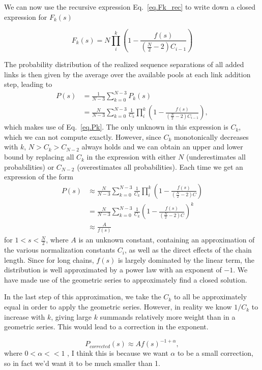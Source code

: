 \documentclass[reprint,amsmath,amssymb,rmp,onecolumn,notitlepage,11pt]{revtex4-1}
\newcommand{\red}[1]{\textcolor{red!80!black}{#1}}
\begin{document}
We can now use the recursive expression Eq.~\ref{eq.Fk_rec} to write down a closed expression for $F_k(s)$

\begin{equation}
    F_k(s)=N\prod_{i}^k\left(1-\frac{f(s)}{(\frac{N}{2}-2)C_{i-1}} \right)
\end{equation}

The probability distribution of the realized sequence separations of all added links is then given by the average over the available pools at each link addition step, leading to
\begin{align}
    P(s)&=\frac{1}{N-3}\sum_{k=0}^{N-3} P_k(s) \nonumber \\
    &= \frac{N}{N-3}\sum_{k=0}^{N-3} \frac{1}{C_k}\prod_{i}^k\left(1-\frac{f(s)}{(\frac{N}{2}-2)C_{i-1}} \right),
\end{align}
which makes use of Eq.~\ref{eq.Pk}. The only unknown in this expression is $C_k$, which we can not compute exactly. However, since $C_k$ monotonically decreases with $k$, $N>C_k>C_{N-2}$ always holds and we can obtain an upper and lower bound by replacing all $C_k$ in the expression with either $N$ (underestimates all probabilities) or $C_{N-2}$ (overestimates all probabilities). Each time we get an expression of the form 
\begin{align}
     P(s)&\approx\frac{N}{N-3}\sum_{k=0}^{N-3} \frac{1}{C_k}\prod_{i}^k\left(1-\frac{f(s)}{(\frac{N}{2}-2)C} \right)\nonumber \\
     &=\frac{N}{N-3} \sum_{k=0}^{N-3}\frac{1}{C_k}\left(1-\frac{f(s)}{(\frac{N}{2}-2)C} \right)^k \nonumber \\
     &\approx \frac{A}{f(s)}
\end{align}
for $1<s<\frac{N}{2}$,
where $A$ is an unknown constant, containing an approximation of the various normalization constants $C_i$, as well as the direct effects of the chain length. 
Since for long chains, $f(s)$ is largely dominated by the linear term, the distribution is well approximated by a power law with an exponent of $-1$. We have made use of the geometric series to approximately find a closed solution. 

In the last step of this approximation, we take the $C_k$ to all be approximately equal in order to apply the geometric series. However, in reality we know $1/C_k$ to increase with $k$, giving large $k$ summands relatively more weight than in a geometric series. This would lead to a correction in the exponent.

\begin{equation}
    P_{corrected}(s)\approx A f(s)^{-1+\alpha},
\end{equation}
where $0<\alpha<<1$ \red{, I think this is because we want $\alpha$ to be a small correction, so in fact we'd want it to be much smaller than 1}.
\end{document}
